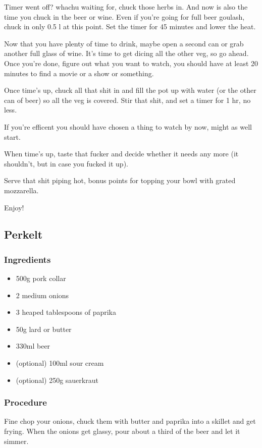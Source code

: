 \documentclass[10pt]{article}
\begin{document}
Timer went off? whachu waiting for, chuck those herbs in. And now is also the time you chuck in the beer or wine. Even if you're going for full beer goulash, chuck in only 0.5 l at this point. Set the timer for 45 minutes and lower the heat.\par
Now that you have plenty of time to drink, maybe open a second can or grab another full glass of wine. It's time to get dicing all the other veg, so go ahead. Once you're done, figure out what you want to watch, you should have at least 20 minutes to find a movie or a show or something.\par
Once time's up, chuck all that shit in and fill the pot up with water (or the other can of beer) so all the veg is covered. Stir that shit, and set a timer for 1 hr, no less.\par
If you're efficent you should have chosen a thing to watch by now, might as well start.\par
When time's up, taste that fucker and decide whether it needs any more (it shouldn't, but in case you fucked it up).\par
Serve that shit piping hot, bonus points for topping your bowl with grated mozzarella.\par
\par
Enjoy!


\subsection{Perkelt}%
\label{sub:perkelt}

\subsubsection{Ingredients}%
\label{ssub:ingredients}

\begin{itemize}
	\item 500g pork collar
	\item 2 medium onions
	\item 3 heaped tablespoons of paprika
	\item 50g lard or butter
	\item 330ml beer
	\item (optional) 100ml sour cream
	\item (optional) 250g sauerkraut
\end{itemize}
\subsubsection{Procedure}%
\label{ssub:procedure}
Fine chop your onions, chuck them with butter and paprika into a skillet and get frying. When the onions get glassy, pour about a third of the beer and let it simmer.\par
\end{document}
